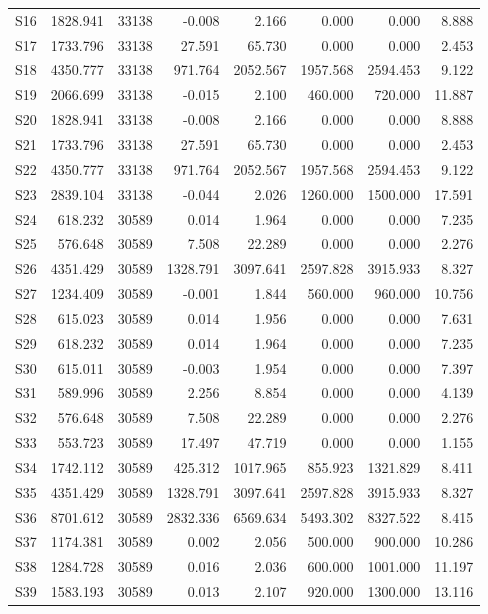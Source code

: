 \begin{longtable}{lrrrrrrr}
S16 & 1828.941 & 33138 & -0.008 & 2.166 & 0.000 & 0.000 & 8.888\\
S17 & 1733.796 & 33138 & 27.591 & 65.730 & 0.000 & 0.000 & 2.453\\
S18 & 4350.777 & 33138 & 971.764 & 2052.567 & 1957.568 & 2594.453 & 9.122\\
S19 & 2066.699 & 33138 & -0.015 & 2.100 & 460.000 & 720.000 & 11.887\\
S20 & 1828.941 & 33138 & -0.008 & 2.166 & 0.000 & 0.000 & 8.888\\
S21 & 1733.796 & 33138 & 27.591 & 65.730 & 0.000 & 0.000 & 2.453\\
S22 & 4350.777 & 33138 & 971.764 & 2052.567 & 1957.568 & 2594.453 & 9.122\\
S23 & 2839.104 & 33138 & -0.044 & 2.026 & 1260.000 & 1500.000 & 17.591\\
S24 & 618.232 & 30589 & 0.014 & 1.964 & 0.000 & 0.000 & 7.235\\
S25 & 576.648 & 30589 & 7.508 & 22.289 & 0.000 & 0.000 & 2.276\\
S26 & 4351.429 & 30589 & 1328.791 & 3097.641 & 2597.828 & 3915.933 & 8.327\\
S27 & 1234.409 & 30589 & -0.001 & 1.844 & 560.000 & 960.000 & 10.756\\
S28 & 615.023 & 30589 & 0.014 & 1.956 & 0.000 & 0.000 & 7.631\\
S29 & 618.232 & 30589 & 0.014 & 1.964 & 0.000 & 0.000 & 7.235\\
S30 & 615.011 & 30589 & -0.003 & 1.954 & 0.000 & 0.000 & 7.397\\
S31 & 589.996 & 30589 & 2.256 & 8.854 & 0.000 & 0.000 & 4.139\\
S32 & 576.648 & 30589 & 7.508 & 22.289 & 0.000 & 0.000 & 2.276\\
S33 & 553.723 & 30589 & 17.497 & 47.719 & 0.000 & 0.000 & 1.155\\
S34 & 1742.112 & 30589 & 425.312 & 1017.965 & 855.923 & 1321.829 & 8.411\\
S35 & 4351.429 & 30589 & 1328.791 & 3097.641 & 2597.828 & 3915.933 & 8.327\\
S36 & 8701.612 & 30589 & 2832.336 & 6569.634 & 5493.302 & 8327.522 & 8.415\\
S37 & 1174.381 & 30589 & 0.002 & 2.056 & 500.000 & 900.000 & 10.286\\
S38 & 1284.728 & 30589 & 0.016 & 2.036 & 600.000 & 1001.000 & 11.197\\
S39 & 1583.193 & 30589 & 0.013 & 2.107 & 920.000 & 1300.000 & 13.116\\

\end{longtable}
